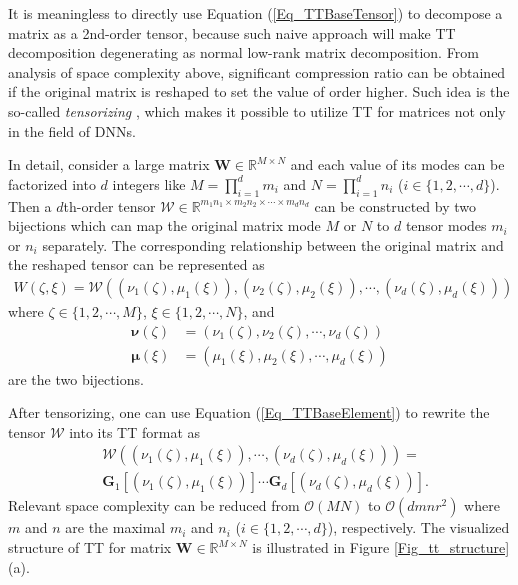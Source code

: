 \documentclass[a4paper,fleqn]{cas-dc}
\begin{document}
It is meaningless to directly use Equation (\ref{Eq_TTBaseTensor}) to decompose a matrix as a 2nd-order tensor, because such naive approach will make TT decomposition degenerating as normal low-rank matrix decomposition. From analysis of space complexity above, significant compression ratio can be obtained if the original matrix is reshaped to set the value of order higher. Such idea is the so-called \emph{tensorizing} \citep{Novikov_2015_TT}, which makes it possible to utilize TT for matrices not only in the field of DNNs.

In detail, consider a large matrix \( \bm{W} \in \mathbb{R} ^{M \times N} \) and each value of its modes can be factorized into \( d \) integers like \(M=\prod_{i=1}^{d} m_{i}\) and \(N=\prod_{i=1}^{d} n_{i}\) (\( i \in \{1,2,\cdots,d\} \)). Then a \( d \)th-order tensor \( \bm{ \mathcal{W} } \in \mathbb{R} ^{m_{1}n_{1} \times m_{2}n_{2} \times \cdots \times m_{d}n_{d}} \) can be constructed by two bijections which can map the original matrix mode \( M \) or \( N \) to \( d \) tensor modes \( m_{i} \) or \( n_{i} \) separately. The corresponding relationship between the original matrix and the reshaped tensor can be represented as
\begin{equation*}
\begin{aligned}
W(\zeta,\xi) = \mathcal{W}((\nu_{1}(\zeta),\mu_{1}(\xi)),(\nu_{2}(\zeta),\mu_{2}(\xi)),\cdots,(\nu_{d}(\zeta),\mu_{d}(\xi)))
\end{aligned}
\end{equation*}
where \( \zeta \in \{1, 2, \cdots, M\} \), \( \xi \in \{1, 2, \cdots, N\} \), and
\begin{equation*}
\begin{aligned}
\bm{\nu}(\zeta) &= (\nu_{1}(\zeta), \nu_{2}(\zeta), \cdots, \nu_{d}(\zeta)) \\
\bm{\mu}(\xi) &= (\mu_{1}(\xi), \mu_{2}(\xi), \cdots, \mu_{d}(\xi))
\end{aligned}
\end{equation*}
are the two bijections.

After tensorizing, one can use Equation (\ref{Eq_TTBaseElement}) to rewrite the tensor \(\bm{\mathcal{W}}\) into its TT format as
\begin{equation}\label{Eq_TTMatrix}
\begin{aligned}
&\mathcal{W}((\nu_{1}(\zeta),\mu_{1}(\xi)),\cdots,(\nu_{d}(\zeta),\mu_{d}(\xi))) = \\
&\bm{G}_1[(\nu_{1}(\zeta),\mu_{1}(\xi))]\cdots\bm{G}_d[(\nu_{d}(\zeta),\mu_{d}(\xi))].
\end{aligned}
\end{equation}
Relevant space complexity can be reduced from \(\mathcal{O}(MN)\) to \(\mathcal{O}(dmnr^2)\) where \(m\) and \(n\) are the maximal \(m_i\) and \(n_i\) (\(i \in \{1,2,\cdots,d\}\)), respectively. The visualized structure of TT for matrix   \( \bm{W} \in \mathbb{R} ^{M \times N} \)  is illustrated in Figure \ref{Fig_tt_structure}(a).
\end{document}
